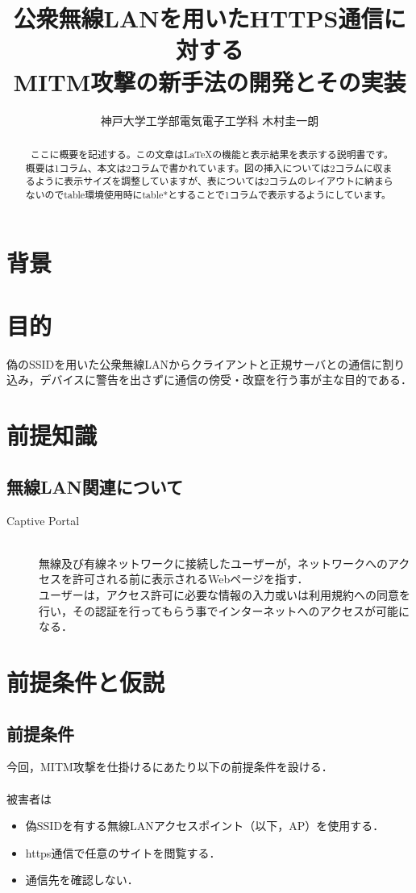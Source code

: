 \documentclass[dvipdfmx]{jsarticle}
\title{公衆無線LANを用いたHTTPS通信に対する\\MITM攻撃の新手法の開発とその実装}
\author{神戸大学工学部電気電子工学科 木村圭一朗}
\begin{document}
    \maketitle
    \begin{abstract}
        \ ここに概要を記述する。この文章は\LaTeX の機能と表示結果を表示する説明書です。概要は1コラム、本文は2コラムで書かれています。図の挿入については2コラムに収まるように表示サイズを調整していますが、表については2コラムのレイアウトに納まらないのでtable環境使用時にtable*とすることで1コラムで表示するようにしています。
        \newline
    \end{abstract}
    \tableofcontents
    \clearpage
    \section{背景}
    
    \section{目的}
    偽のSSIDを用いた公衆無線LANからクライアントと正規サーバとの通信に割り込み，デバイスに警告を出さずに通信の傍受・改竄を行う事が主な目的である．
    \section{前提知識}
    \subsection{無線LAN関連について}
    \begin{description}
        \item [Captive Portal]\mbox{}\\
            無線及び有線ネットワークに接続したユーザーが，ネットワークへのアクセスを許可される前に表示されるWebページを指す．\\
            ユーザーは，アクセス許可に必要な情報の入力或いは利用規約への同意を行い，その認証を行ってもらう事でインターネットへのアクセスが可能になる．
    \end{description}
    \section{前提条件と仮説}
    \subsection{前提条件}
    今回，MITM攻撃を仕掛けるにあたり以下の前提条件を設ける．\\
    \\
    被害者は
    \begin{itemize}
        \item 偽SSIDを有する無線LANアクセスポイント（以下，AP）を使用する．
        \item https通信で任意のサイトを閲覧する．
        \item 通信先を確認しない．
    \end{itemize}
\end{document}
